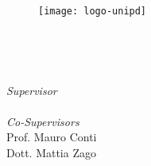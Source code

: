 
\begin{titlepage}

\begin{center}

\begin{LARGE}
\textbf{\myUni}\\
\end{LARGE}

\vspace{10pt}

\begin{Large}
\textsc{\myDepartment}\\
\end{Large}

\vspace{10pt}

\begin{large}
\textsc{\myFaculty}\\
\end{large}

\vspace{30pt}
\begin{figure}[htbp]
\begin{center}
\texttt{[image: logo-unipd]}
\end{center}
\end{figure}
\vspace{1pt} 

\begin{LARGE}
\begin{center}
\textbf{\myTitle}\\
\end{center}
\end{LARGE}

\vspace{10pt} 

\begin{large}
\textsl{\myDegree}\\
\end{large}

\vspace{20pt} 

\begin{large}
\begin{flushleft}
\textit{Supervisor}\\ 
\vspace{3pt} 
\profTitle \myProf \\
\vspace{7pt} 
\textit{Co-Supervisors}\\ 
\vspace{3pt} 
Prof. Mauro Conti\\
\vspace{2pt} 
Dott. Mattia Zago
\end{flushleft}


\end{large}
\end{center}
\end{titlepage}
